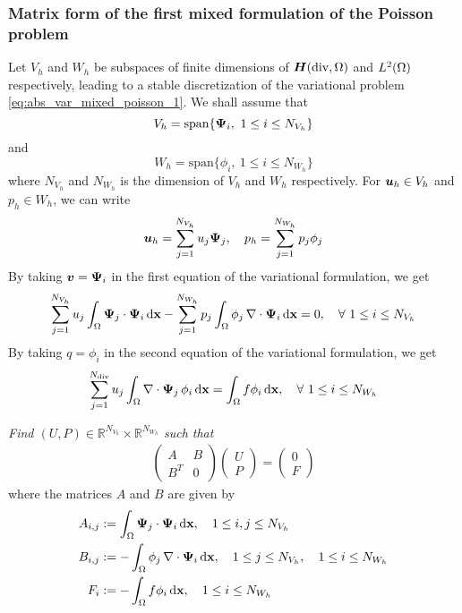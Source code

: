\subsubsection*{Matrix form of the first mixed formulation of the Poisson problem}
%
Let $V_h$ and $W_h$ be subspaces of finite dimensions of $\bm{H}(\mbox{div}, \Omega)$ and $L^2(\Omega)$ respectively, leading to a stable discretization of the variational problem \eqref{eq:abs_var_mixed_poisson_1}.
We shall assume that 
$$V_h = \mathrm{span}\{ \boldsymbol{\Psi}_{i}, ~ 1 \leq i \leq N_{V_h} \}$$ 
and
$$W_h = \mathrm{span}\{ \phi_{i}, ~ 1 \leq i \leq N_{W_h} \}$$ 
where $N_{V_h}$ and $N_{W_h}$ is the dimension of $V_h$ and $W_h$ respectively.
For $\bm{u}_h \in V_h$ and $p_h \in W_h$, we can write
\begin{align*}
  \bm{u}_h = \sum\limits_{j=1}^{N_{V_h}} u_{j} \boldsymbol{\Psi}_{j}, \quad 
  p_h = \sum\limits_{j=1}^{N_{W_h}} p_{j} \phi_{j} 
\end{align*}
By taking $\bm{v} = \boldsymbol{\Psi}_{i}$ in the first equation of the variational formulation, we get
\begin{align*}
 \sum\limits_{j=1}^{N_{V_h}} u_{j} \int_{\Omega} \boldsymbol{\Psi}_{j}\cdot \boldsymbol{\Psi}_{i} \,{\rm d} \mathbf{x} 
 - \sum\limits_{j=1}^{N_{W_h}} p_{j} \int_{\Omega} \phi_{j} \, \nabla \cdot \boldsymbol{\Psi}_{i} \,{\rm d} \mathbf{x} =0, \quad \forall ~ 1 \leq i \leq N_{V_h}
\end{align*}
By taking $q = \phi_{i}$ in the second equation of the variational formulation, we get
\begin{align*}
 \sum\limits_{j=1}^{N_{\mathrm{div}}} u_{j} \int_{\Omega} \nabla\cdot\boldsymbol{\Psi}_{j} \, \phi_{i} \,{\rm d} \mathbf{x} = \int_{\Omega} f \phi_{i} \,{\rm d} \mathbf{x}, \quad \forall ~ 1 \leq i \leq N_{W_h} 
\end{align*}
\begin{tcolorbox}
  {\em Find $(U,P) \in \mathbb{R}^{N_{V_h}} \times \mathbb{R}^{N_{W_h}}$ such that}
  \begin{align}
    \begin{pmatrix}
      A   & B \\
      B^T & 0 
    \end{pmatrix}
    \begin{pmatrix} U \\ P \end{pmatrix}
    = \begin{pmatrix} 0 \\ F \end{pmatrix}
  \end{align}
  where the matrices $A$ and $B$ are given by
  \begin{align*}
    A_{i, j} &:=  \int_{\Omega} \boldsymbol{\Psi}_{j}\cdot \boldsymbol{\Psi}_{i} \,{\rm d} \mathbf{x}  
    ,  \quad 1 \leq i, j \leq N_{V_h}
    \\
    B_{i, j} &:=  - \int_{\Omega} \phi_{j} \, \nabla \cdot \boldsymbol{\Psi}_{i} \,{\rm d} \mathbf{x}  
    ,  \quad 1 \leq j \leq N_{V_h} 
    , \quad 1 \leq i \leq N_{W_h} 
    \\
    F_{i} &:= - \int_{\Omega} f \phi_{i} \,{\rm d} \mathbf{x} 
    , \quad 1 \leq i \leq N_{W_h} 
  \end{align*}
  \label{tcb:mixed_poisson_1}
\end{tcolorbox}


